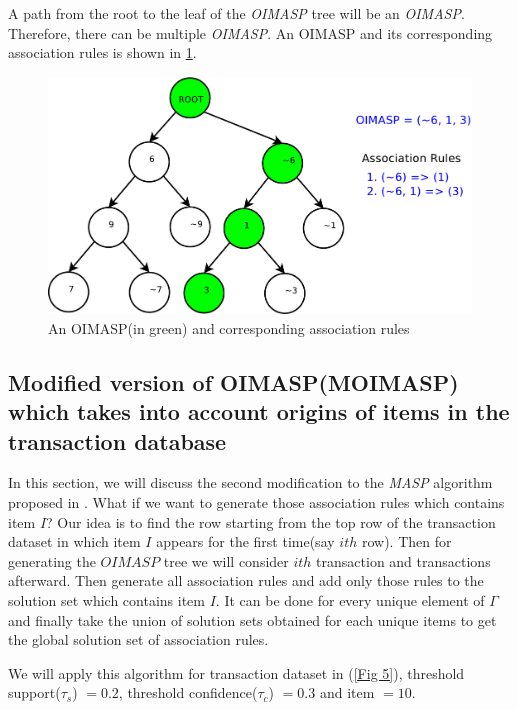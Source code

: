 \documentclass[review]{elsarticle}
\begin{document}
A path from the root to the leaf of the \emph{OIMASP} tree will be an \emph{OIMASP}. Therefore, there can be multiple \emph{OIMASP}. An OIMASP and its corresponding association rules is shown in \ref{Fig 7}.

\begin{figure}
\begin{center}
\includegraphics[scale=0.35]{pdf/oimasp}
\end{center}
\caption{An OIMASP(in green) and corresponding association rules}
\label{Fig 7}
\end{figure}

\subsection{Modified version of OIMASP(MOIMASP) which takes into account origins of items in the transaction database}
In this section, we will discuss the second modification to the \emph{MASP} algorithm proposed in \cite{oldmasp}. What if we want to generate those association rules which contains item $ I $? Our idea is to find the row starting from the top row of the transaction dataset in which item $ I $ appears for the first time(say $ ith $ row). Then for generating the $ OIMASP $ tree we will consider $ ith $ transaction and transactions afterward. Then generate all association rules and add only those rules to the solution set which contains item $ I $. It can be done for every unique element of $ \Gamma $ and finally take the union of solution sets obtained for each unique items to get the global solution set of association rules.

We will apply this algorithm for transaction dataset in (\ref{Fig 5}), threshold support($ \tau _{s} $) $ = 0.2 $, threshold confidence($ \tau _{c} $) $ = 0.3 $ and item $ = 10 $.
\end{document}
